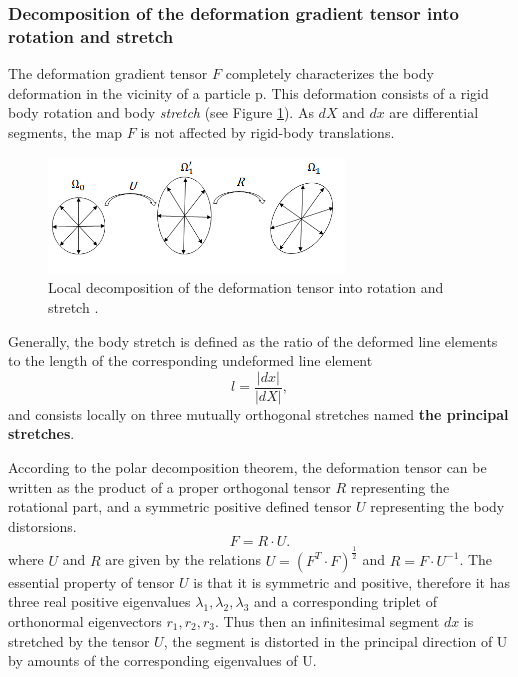 \subsubsection*{Decomposition of the deformation gradient tensor into rotation and stretch}\label{deformationgradienttensor}
The deformation gradient tensor $F$ completely characterizes
the body deformation in the vicinity of a particle p. This deformation consists of a rigid body rotation and body \textit{stretch} (see Figure \ref{deformationGradientDecom}). As $dX$ and $dx$ are differential segments, the map $F$ is not affected by rigid-body translations.  

\begin{figure}
\begin{center}
\includegraphics[width=0.7\textwidth,keepaspectratio]{figures/deformationTensorDecomposition.png} 
\caption[]{Local decomposition of the deformation tensor into rotation and stretch .  }
\label{deformationGradientDecom}
\end{center}
\end{figure}


Generally, the body stretch is defined as the ratio of the deformed line elements to the length of the corresponding undeformed line element 
\begin{equation}
l = \frac{\vert dx \vert}{\vert dX \vert},
\end{equation} 
and consists locally on three mutually orthogonal stretches named \textbf{the principal stretches}.

According to the polar decomposition theorem, the deformation tensor can be written as the product of a proper orthogonal tensor $R$ representing the rotational part, and a symmetric positive defined tensor $U$ representing the body distorsions. 
\begin{equation}
F = R \cdot U.
\end{equation}
where $U$ and $R$ are given by the relations $U = (F^T \cdot F)^ {\frac{1}{2}} $ and $R = F \cdot U^{-1}$. The essential property of tensor $U$ is that it is symmetric and positive, therefore it has three real positive eigenvalues
$\lambda_1, \lambda_2, \lambda_3$ and a corresponding triplet of orthonormal eigenvectors $r_1, r_2, r_3$. Thus then an infinitesimal segment $dx$ is stretched by the tensor $U$, the segment is distorted in the principal direction of U by amounts of the corresponding eigenvalues of U. 


